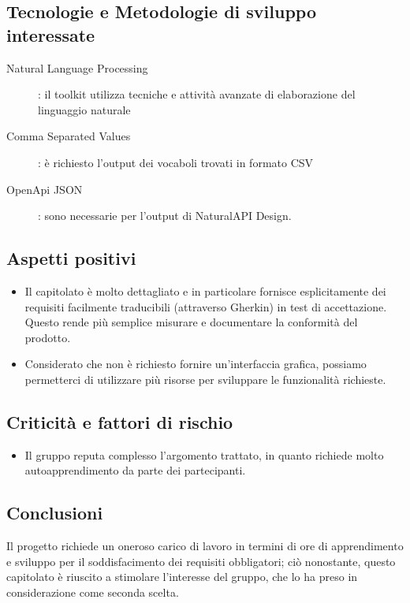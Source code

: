 \documentclass[../studio-di-fattibilita.tex]{subfiles}
\begin{document}
  \subsection{Tecnologie e Metodologie di sviluppo interessate}%
  \label{subsec:tecnologie_interessate}
  \begin{description}
    \item[Natural Language Processing]: il toolkit utilizza tecniche e attività avanzate di elaborazione del linguaggio naturale
    \item[Comma Separated Values]: è richiesto l'output dei vocaboli trovati in formato CSV
    \item[OpenApi JSON]: sono necessarie per l'output di NaturalAPI Design.
  \end{description}


  \subsection{Aspetti positivi}%
  \label{subsec:aspetti_positivi}
  \begin{itemize}
    \item Il capitolato è molto dettagliato e in particolare fornisce esplicitamente dei requisiti facilmente traducibili (attraverso Gherkin) in test di accettazione. Questo rende più semplice misurare e documentare la conformità del prodotto.
    \item Considerato che non è richiesto fornire un'interfaccia grafica, possiamo permetterci di utilizzare più risorse per sviluppare le funzionalità richieste.
  \end{itemize}


  \subsection{Criticità e fattori di rischio}%
  \label{subsec:criticita_e_fattori_di_rischio}
  \begin{itemize}
    \item Il gruppo reputa complesso l'argomento trattato, in quanto richiede molto autoapprendimento da parte dei partecipanti.
  \end{itemize}


  \subsection{Conclusioni}%
  \label{subsec:conclusioni}
  Il progetto richiede un oneroso carico di lavoro in termini di ore di apprendimento e sviluppo per il soddisfacimento dei requisiti obbligatori; ciò nonostante, questo capitolato è riuscito a stimolare l'interesse del gruppo, che lo ha preso in considerazione come seconda scelta.
\end{document}
